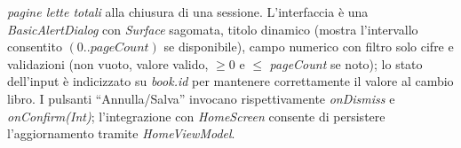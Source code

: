 \documentclass{article}
\begin{document}
\begin{itemize}
\begin{itemize}
\begin{itemize}
      \emph{pagine lette totali} alla chiusura di una sessione. L’interfaccia è una \textit{BasicAlertDialog} con 
      \textit{Surface} sagomata, titolo dinamico (mostra l’intervallo consentito \((0..pageCount)\) se disponibile), 
      campo numerico con filtro solo cifre e validazioni (non vuoto, valore valido, \(\ge 0\) e \(\le\) \textit{pageCount} se noto); 
      lo stato dell’input è indicizzato su \textit{book.id} per mantenere correttamente il valore al cambio libro. I pulsanti “Annulla/Salva” 
      invocano rispettivamente \textit{onDismiss} e \textit{onConfirm(Int)}; l’integrazione con \textit{HomeScreen} consente di persistere l’aggiornamento tramite \textit{HomeViewModel}.
    \end{itemize}
  \end{itemize}
  
\end{itemize}
\end{document}
